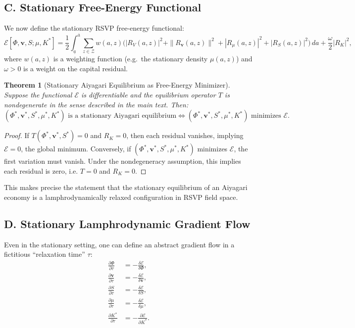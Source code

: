 \documentclass[12pt]{article}
\newtheorem{theorem}{Theorem}
\begin{document}
\subsection*{C. Stationary Free-Energy Functional}

We now define the stationary RSVP free-energy functional:
\begin{equation}
\mathcal{E}[\Phi,\mathbf{v},S;\mu,K^\ast]
=
\frac{1}{2}
\int_{\underline{a}}^{\overline{a}}
\sum_{z\in\mathcal{Z}}
w(a,z)
\Big(
    |R_V(a,z)|^2
  + \|R_{\mathbf{v}}(a,z)\|^2
  + |R_\mu(a,z)|^2
  + |R_S(a,z)|^2
\Big)\, da
+ \frac{\omega}{2} |R_K|^2,
\end{equation}
where $w(a,z)$ is a weighting function (e.g.\ the stationary density
$\mu(a,z)$) and $\omega>0$ is a weight on the capital residual.

\begin{theorem}[Stationary Aiyagari Equilibrium as Free-Energy Minimizer]
Suppose the functional $\mathcal{E}$ is differentiable and the
equilibrium operator $T$ is nondegenerate in the sense described in the
main text. Then:
\[
(\Phi^\ast,\mathbf{v}^\ast,S^\ast,\mu^\ast,K^\ast)
\text{ is a stationary Aiyagari equilibrium}
\iff
(\Phi^\ast,\mathbf{v}^\ast,S^\ast,\mu^\ast,K^\ast)
\text{ minimizes } \mathcal{E}.
\]
\end{theorem}

\begin{proof}
If $T(\Phi^\ast,\mathbf{v}^\ast,S^\ast)=0$ and $R_K=0$, then each
residual vanishes, implying $\mathcal{E}=0$, the global minimum. 
Conversely, if $(\Phi^\ast,\mathbf{v}^\ast,S^\ast,\mu^\ast,K^\ast)$ 
minimizes $\mathcal{E}$, the first variation must vanish. Under the 
nondegeneracy assumption, this implies each residual is zero, i.e. 
$T=0$ and $R_K=0$.
\end{proof}

This makes precise the statement that the stationary equilibrium of an
Aiyagari economy is a lamphrodynamically relaxed configuration in RSVP
field space.

\subsection*{D. Stationary Lamphrodynamic Gradient Flow}

Even in the stationary setting, one can define an abstract gradient flow
in a fictitious ``relaxation time'' $\tau$:
\begin{align}
\frac{\partial \Phi}{\partial \tau}
&= - \frac{\delta \mathcal{E}}{\delta \Phi},\\[4pt]
\frac{\partial \mathbf{v}}{\partial \tau}
&= - \frac{\delta \mathcal{E}}{\delta \mathbf{v}},\\[4pt]
\frac{\partial S}{\partial \tau}
&= - \frac{\delta \mathcal{E}}{\delta S},\\[4pt]
\frac{\partial \mu}{\partial \tau}
&= - \frac{\delta \mathcal{E}}{\delta \mu},\\[4pt]
\frac{\partial K^\ast}{\partial \tau}
&= - \frac{\partial \mathcal{E}}{\partial K^\ast}.
\end{align}
\end{document}

